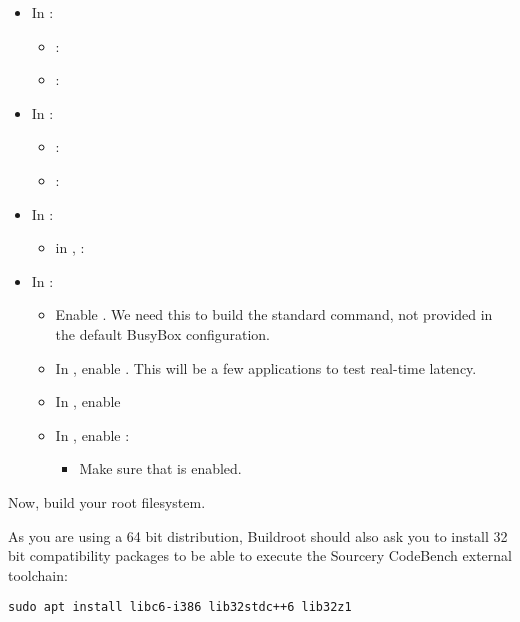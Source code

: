 \begin{itemize}
\item In :
   \begin{itemize}
   \item {}: 
   \item {}: 
   \end{itemize}
\item In :
   \begin{itemize}
   \item {}: 
   \item {}: 
   \end{itemize}
\item In :
   \begin{itemize}
   \item in ,  : 
   \end{itemize}
\item In :
   \begin{itemize}
   \item Enable .
         We need this to build the standard  command, not
         provided in the default BusyBox configuration.
   \item In , enable
         . This will be a few applications to test
         real-time latency.
   \item In , enable 
   \item In , enable :
         \begin{itemize}
	 \item Make sure that  is enabled.
	 \end{itemize}
   \end{itemize}
\end{itemize}

Now, build your root filesystem.

As you are using a 64 bit distribution, Buildroot should also ask
you to install 32 bit compatibility packages to be able to execute the
Sourcery CodeBench external toolchain:

\begin{verbatim}
sudo apt install libc6-i386 lib32stdc++6 lib32z1
\end{verbatim}

